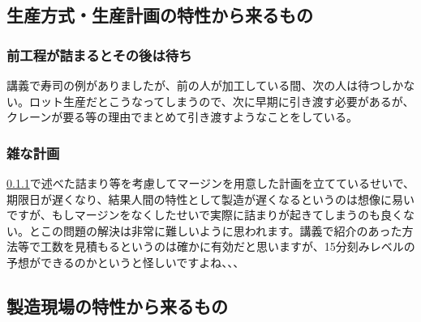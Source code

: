 \documentclass[dvipdfmx,a4paper]{jsarticle}
\begin{document}
\subsection{生産方式・生産計画の特性から来るもの}

\subsubsection{前工程が詰まるとその後は待ち}
\label{maekotei}
講義で寿司の例がありましたが、前の人が加工している間、次の人は待つしかない。ロット生産だとこうなってしまうので、次に早期に引き渡す必要があるが、クレーンが要る等の理由でまとめて引き渡すようなことをしている。

\subsubsection{雑な計画}
\ref{maekotei}で述べた詰まり等を考慮してマージンを用意した計画を立てているせいで、期限日が遅くなり、結果人間の特性として製造が遅くなるというのは想像に易いですが、もしマージンをなくしたせいで実際に詰まりが起きてしまうのも良くない。とこの問題の解決は非常に難しいように思われます。講義で紹介のあった方法等で工数を見積もるというのは確かに有効だと思いますが、15分刻みレベルの予想ができるのかというと怪しいですよね、、、

\subsection{製造現場の特性から来るもの}
\end{document}
